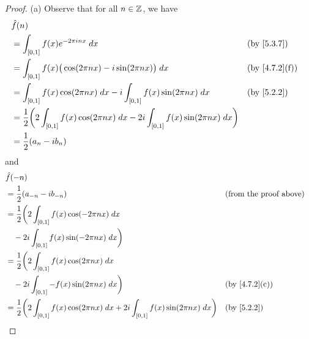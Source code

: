 \begin{proof}{(a)}
  Observe that for all \(n \in \mathbb{Z}\), we have
  \begin{align*}
     & \hat{f}(n)                                                                                                                                           \\
     & = \int_{[0, 1]} f(x) e^{- 2 \pi i n x} \; dx                                                                        &  & \by{5.3.7}                  \\
     & = \int_{[0, 1]} f(x) \big(\cos(2 \pi n x) - i \sin(2 \pi n x)\big) \; dx                                            &  & \text{(by \cref{4.7.2}(f))} \\
     & = \int_{[0, 1]} f(x) \cos(2 \pi n x) \; dx - i \int_{[0, 1]} f(x) \sin(2 \pi n x) \; dx                             &  & \by{5.2.2}                  \\
     & = \dfrac{1}{2} \bigg(2 \int_{[0, 1]} f(x) \cos(2 \pi n x) \; dx - 2i \int_{[0, 1]} f(x) \sin(2 \pi n x) \; dx\bigg)                                  \\
     & = \dfrac{1}{2} (a_n - i b_n)
  \end{align*}
  and
  \begin{align*}
     & \hat{f}(-n)                                                                                                                                            \\
     & = \dfrac{1}{2} (a_{-n} - i b_{-n})                                                                                  &  & \text{(from the proof above)} \\
     & = \dfrac{1}{2} \bigg(2 \int_{[0, 1]} f(x) \cos(- 2 \pi n x) \; dx                                                                                      \\
     & \quad - 2i \int_{[0, 1]} f(x) \sin(- 2 \pi n x) \; dx\bigg)                                                                                            \\
     & = \dfrac{1}{2} \bigg(2 \int_{[0, 1]} f(x) \cos(2 \pi n x) \; dx                                                                                        \\
     & \quad - 2i \int_{[0, 1]} -f(x) \sin(2 \pi n x) \; dx\bigg)                                                          &  & \text{(by \cref{4.7.2}(c))}   \\
     & = \dfrac{1}{2} \bigg(2 \int_{[0, 1]} f(x) \cos(2 \pi n x) \; dx + 2i \int_{[0, 1]} f(x) \sin(2 \pi n x) \; dx\bigg) &  & \by{5.2.2}                    \\

\end{align*}
\end{proof}
